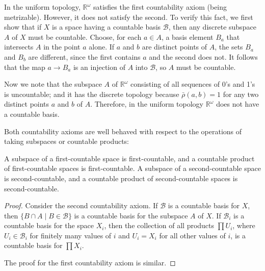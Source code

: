 \begin{centeredblock}
\begin{example}
\label{ex:\thesection.\theexample}
 In the uniform topology, \(\mathbb{R}^{\omega }\) satisfies the first countability axiom (being metrizable). However, it does not satisfy the second. To verify this fact, we first show that if \(X\) is a space having a countable basis \(\mathcal{B}\), then any discrete subspace \(A\) of \(X\) must be countable. Choose, for each \(a \in A\), a basis element \(B_{a}\) that intersects \(A\) in the point \(a\) alone. If \(a\) and \(b\) are distinct points of \(A\), the sets \(B_{a}\) and \(B_{b}\) are different, since the first contains \(a\) and the second does not. It follows that the map \(a \rightarrow {B}_{a}\) is an injection of \(A\) into \(\mathcal{B}\), so \(A\) must be countable.

Now we note that the subspace \(A\) of \(\mathbb{R}^{\omega }\) consisting of all sequences of 0's and 1's is uncountable; and it has the discrete topology because \(\bar{\rho }( {a,b}) = 1\) for any two distinct points \(a\) and \(b\) of \(A\). Therefore, in the uniform topology \(\mathbb{R}^{\omega }\) does not have a countable basis.
\end{example}
\end{centeredblock}

Both countability axioms are well behaved with respect to the operations of taking subspaces or countable products:

\begin{theorem}
\label{thm:\thetheorem}
 A subspace of a first-countable space is first-countable, and a countable product of first-countable spaces is first-countable. A subspace of a second-countable space is second-countable, and a countable product of second-countable spaces is second-countable.

\end{theorem}
\begin{proof}
Consider the second countability axiom. If \(\mathcal{B}\) is a countable basis for \(X\), then \(\{ B \cap A \mid B \in \mathcal{B}\}\) is a countable basis for the subspace \(A\) of \(X\). If \(\mathcal{B}_{i}\) is a countable basis for the space \(X_{i}\), then the collection of all products \(\prod {U}_{i}\), where \(U_{i} \in {\mathcal{B}}_{i}\) for finitely many values of \(i\) and \(U_{i} = X_{i}\) for all other values of \(i\), is a countable basis for \(\prod {X}_{i}\).

The proof for the first countability axiom is similar.
\end{proof}

